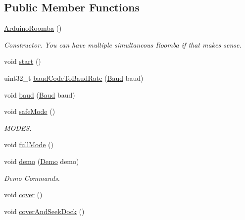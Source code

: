\subsection*{Public Member Functions}
\begin{DoxyCompactItemize}
\item 
\hypertarget{class_arduino_roomba_af7d106ebf18714863cea529689689180}{
\hyperlink{class_arduino_roomba_af7d106ebf18714863cea529689689180}{ArduinoRoomba} ()}
\label{class_arduino_roomba_af7d106ebf18714863cea529689689180}

\begin{DoxyCompactList}\small\item\em Constructor. You can have multiple simultaneous Roomba if that makes sense. \item\end{DoxyCompactList}\item 
void \hyperlink{class_arduino_roomba_a6d5b8f94e27b55bd3a4e63590cf336e0}{start} ()
\item 
uint32\_\-t \hyperlink{class_arduino_roomba_aaa460766ddc8c809e6372a3489df9df0}{baudCodeToBaudRate} (\hyperlink{class_arduino_roomba_af609a2cdb5613e540d5858dd94defc52}{Baud} baud)
\item 
void \hyperlink{class_arduino_roomba_a3ac15c917953118a2a4e6f68ed5649e9}{baud} (\hyperlink{class_arduino_roomba_af609a2cdb5613e540d5858dd94defc52}{Baud} baud)
\item 
void \hyperlink{class_arduino_roomba_ac8fb620b0926e6faa570509834434ddf}{safeMode} ()
\begin{DoxyCompactList}\small\item\em MODES. \item\end{DoxyCompactList}\item 
void \hyperlink{class_arduino_roomba_ac4c6eb5bb47c95b7adf712926fa43edb}{fullMode} ()
\item 
void \hyperlink{class_arduino_roomba_ae70e79632298dc573ad23cbce5f72941}{demo} (\hyperlink{class_arduino_roomba_a7c3cccf56b26a783de296211b9e6aa7a}{Demo} demo)
\begin{DoxyCompactList}\small\item\em Demo Commands. \item\end{DoxyCompactList}\item 
void \hyperlink{class_arduino_roomba_acb2d35018865cc262ab638436b084362}{cover} ()
\item 
void \hyperlink{class_arduino_roomba_ab64590ea5cdd54a15eb62e96f61839b6}{coverAndSeekDock} ()

\end{DoxyCompactItemize}
